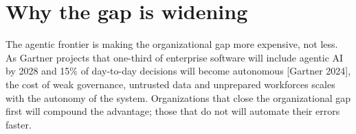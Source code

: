 

\section{Why the gap is widening}

The agentic frontier is making the organizational gap more expensive, not less.
As Gartner projects that one-third of enterprise software will include agentic
AI by 2028 and 15\% of day-to-day decisions will become autonomous [Gartner
2024], the cost of weak governance, untrusted data and unprepared workforces
scales with the autonomy of the system. Organizations that close the
organizational gap first will compound the advantage; those that do not will
automate their errors faster.
